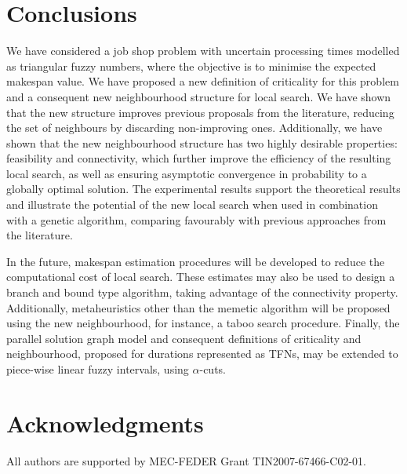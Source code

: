 \documentclass[letterpaper]{article}
\begin{document}
%
\section{Conclusions}\label{secConclusions}
We have considered a job shop problem with uncertain processing times modelled as triangular fuzzy numbers, where the objective is to minimise the expected makespan value. We have proposed a new definition of criticality for this problem and a consequent new neighbourhood structure for local search. We have shown that the new structure improves previous proposals from the literature, reducing the set of neighbours by discarding non-improving ones. Additionally, we have shown that the new neighbourhood structure has two highly desirable properties: feasibility and connectivity, which further improve the efficiency of the resulting local search, as well as ensuring asymptotic convergence in probability to a globally optimal solution. The experimental results support the theoretical results and illustrate the potential of the new local search when used in combination with a genetic algorithm, comparing favourably with previous approaches from the literature.

In the future, makespan estimation procedures will be developed to reduce the computational cost of local search. These estimates may also be used to design a branch and bound type algorithm, taking advantage of the connectivity property. Additionally, metaheuristics other than the memetic algorithm will be proposed using the new neighbourhood, for instance, a taboo search procedure. Finally, the parallel solution graph model and consequent definitions of criticality and neighbourhood, proposed for durations represented as TFNs, may be extended to piece-wise linear fuzzy intervals, using $\alpha$-cuts.


\section*{ Acknowledgments}
All authors are supported by MEC-FEDER Grant TIN2007-67466-C02-01.

\end{document}
